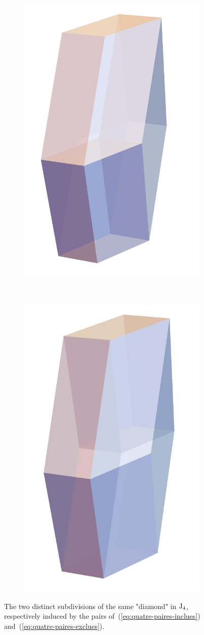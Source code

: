 \documentclass[twoside, 12pt]{amsart}
\theoremstyle{remark}
\begin{document}
\begin{figure}[h!]
\centering
\begin{subfigure}{0.4\textwidth}
    \centering
        \includegraphics[width=0.6\linewidth]{paires-choisies.png} 
    \end{subfigure} ~
    \begin{subfigure}{0.4\textwidth}
    \centering
       \includegraphics[width=0.6\linewidth]{paires-exclues.png}
    \end{subfigure}
\caption{The two distinct subdivisions of the same "diamond" in $\mathrm{J}_4$, respectively induced by the pairs of~(\ref{eq:quatre-paires-inclues}) and~(\ref{eq:quatre-paires-exclues}).}
\label{fig:diamonds}
\end{figure}
\end{document}
